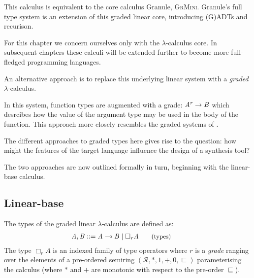 This calculus is equivalent to the core calculus Granule,
\textsc{GrMini}\cite{}. Granule's full type system is an extension of this
graded linear core, introducing (G)ADTs and recurison.

For this chapter we concern ourselves only with the $\lambda$-calculus core.
In subsequent chapters these calculi will be extended further to become more
full-fledged programming languages.



An alternative approach is to replace this underlying linear system  with a
\textit{graded} $\lambda$-calculus.

In this system, function types are augmented with a grade: $\mathit{A} ^ {\mathit{r}}  \rightarrow  \mathit{B}$
which desrcibes how the value of the argument type may be used in the body of
the function. This approach more closely resembles the graded systems of
.

The different approaches to graded types here gives rise to the question: how might the
features of the target language influence the design of a synthesis tool?


The two approaches are now outlined formally in turn, beginning with the
linear-base calculus.

\subsection{Linear-base}
\label{sec:linear-base}
The types of the graded linear $\lambda$-calculus are defined as:
\begin{align*}
\hspace{-0.9em}\mathit{A} , \mathit{B} & ::=
       \mathit{A} \multimap \mathit{B}
  \mid \Box_{  \mathit{r}  }  \mathit{A}
{\small{\tag{types}}}
\end{align*}
The type $\Box_{r} A$ is an indexed family of type operators where $r$ is a
\textit{grade} ranging over the elements of a pre-ordered semiring
$({\mathcal{R}}, {*}, {1}, {+}, {0},
{\sqsubseteq})$ parameterising the calculus (where $\ast$ and $+$
are monotonic with respect to the pre-order $\sqsubseteq$).

